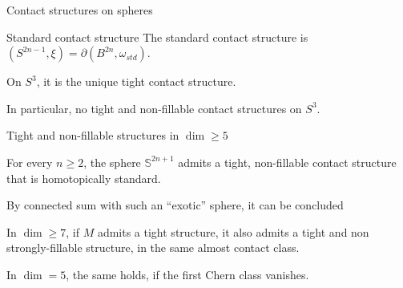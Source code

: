 \documentclass{beamer}
\begin{document}
\begin{frame}{Contact structures on spheres}

\begin{exampleblock}{Standard contact structure}
The standard contact structure is $(S^{2n-1},\xi)=\partial(B^{2n},\omega_{std})$.
\end{exampleblock}

\pause

\begin{theorem}[Eliashberg, '91] 
    On $S^3$, it is the unique tight contact structure.
\end{theorem} 

In particular, no tight and non-fillable contact structures on $S^3$.

    
    
    
    


\end{frame}

\begin{frame}{Tight and non-fillable structures in $\dim \geq 5$}

\begin{theorem}
    For every $n \geq 2$, the sphere $\mathbb S^{2n+1}$ admits a tight, non-fillable contact structure that is homotopically standard.
\end{theorem}

\pause
\vspace*{1cm}
By connected sum with such an ``exotic'' sphere, it can be concluded
\begin{theorem}
In $\dim \geq 7$, if $M$ admits a tight structure, it also admits a tight and non strongly-fillable structure, in the same almost contact class.
\pause

In $\dim=5$, the same holds, if the first Chern class vanishes.
\end{theorem}
\end{frame}
\end{document}
